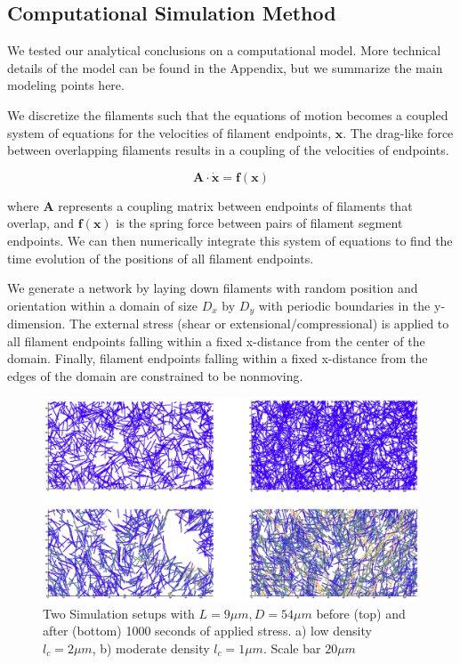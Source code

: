 \documentclass[10pt,letterpaper]{article}
\begin{document}
\subsection*{Computational Simulation Method}

We tested our analytical conclusions on a computational model.  More technical details of the model can be found in the Appendix, but we summarize the main modeling points here.

We discretize the filaments such that the equations of motion becomes a coupled system of equations for the velocities of filament endpoints, $\mathbf{x}$.  The drag-like force between overlapping filaments results in a coupling of the velocities of endpoints.  

\begin{equation}
\mathbf{A \cdot \dot x} = \mathbf{f(x)}
\end{equation}

where $\mathbf{A }$ represents a coupling matrix between endpoints of filaments that overlap, and $\mathbf{f(x)}$ is the spring force between pairs of filament segment endpoints.  We can then numerically integrate this system of equations to find the time evolution of the positions of all filament endpoints.

We generate a network by laying down filaments with random position and orientation within a domain of size $D_x$ by $D_y$ with periodic boundaries in the y-dimension.  The external stress (shear or extensional/compressional) is applied to all filament endpoints falling within a fixed x-distance from the center of the domain.  Finally, filament endpoints falling within a fixed x-distance from the edges of the domain are constrained to be nonmoving.

\begin{figure}[h!]
\centering
\includegraphics[width=\hsize]{network_def}
\caption{\label{fig:sim}Two Simulation setups with $L=9 \mu m, D = 54 \mu m$ before (top) and after  (bottom) 1000 seconds of applied stress. a) low density $l_c=2 \mu m$, b) moderate density $l_c=1 \mu m.  $ Scale bar $ 20 \mu m$}
\end{figure}
\end{document}
